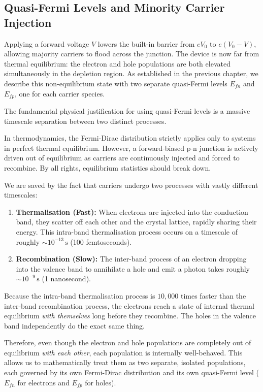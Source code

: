 \subsection{Quasi-Fermi Levels and Minority Carrier Injection}

Applying a forward voltage $V$ lowers the built-in barrier from $eV_0$ to $e(V_0 - V)$, allowing majority carriers to flood across the junction. The device is now far from thermal equilibrium: the electron and hole populations are both elevated simultaneously in the depletion region. As established in the previous chapter, we describe this non-equilibrium state with two separate quasi-Fermi levels $E_{fn}$ and $E_{fp}$, one for each carrier species.

The fundamental physical justification for using quasi-Fermi levels is a massive timescale separation between two distinct processes.

In thermodynamics, the Fermi-Dirac distribution strictly applies only to systems in perfect thermal equilibrium. However, a forward-biased p-n junction is actively driven out of equilibrium as carriers are continuously injected and forced to recombine. By all rights, equilibrium statistics should break down.

We are saved by the fact that carriers undergo two processes with vastly different timescales:
\begin{enumerate}
    \item \textbf{Thermalisation (Fast):} When electrons are injected into the conduction band, they scatter off each other and the crystal lattice, rapidly sharing their energy. This intra-band thermalisation process occurs on a timescale of roughly $\sim 10^{-13}\,\text{s}$ (100 femtoseconds).
    \item \textbf{Recombination (Slow):} The inter-band process of an electron dropping into the valence band to annihilate a hole and emit a photon takes roughly $\sim 10^{-9}\,\text{s}$ (1 nanosecond).
\end{enumerate}

Because the intra-band thermalisation process is $10,000$ times faster than the inter-band recombination process, the electrons reach a state of internal thermal equilibrium \emph{with themselves} long before they recombine. The holes in the valence band independently do the exact same thing. 

Therefore, even though the electron and hole populations are completely out of equilibrium \emph{with each other}, each population is internally well-behaved. This allows us to mathematically treat them as two separate, isolated populations, each governed by its own Fermi-Dirac distribution and its own quasi-Fermi level ($E_{fn}$ for electrons and $E_{fp}$ for holes).

